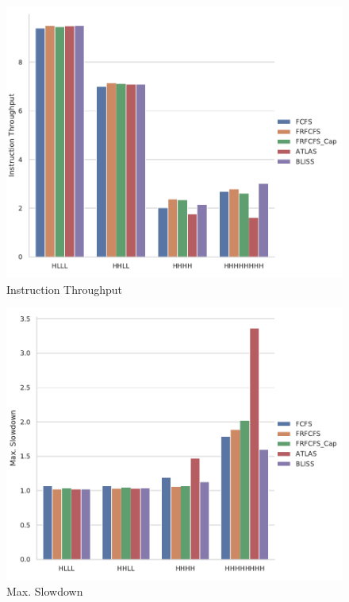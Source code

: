 \documentclass[a4paper]{article}
\begin{document}
\begin{figure}
    \centering
    \includegraphics[width=\textwidth]{inst_throughput}
    \caption{Instruction Throughput}
    \label{fig:inst-throughput}
\end{figure}

\begin{figure}
    \centering
    \includegraphics[width=\textwidth]{max_slowdown}
    \caption{Max. Slowdown}
    \label{fig:max-slowdown}
\end{figure}
\end{document}
